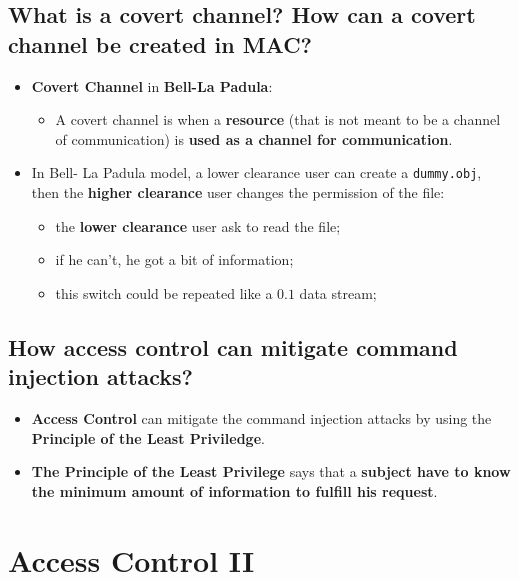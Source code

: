 \documentclass[9pt, letterpaper]{article}
\begin{document}
\subsection{What is a covert channel? How can a covert channel be created in MAC?}
\begin{itemize}
	\item \textbf{Covert Channel} in \textbf{Bell-La Padula}:
	      \begin{itemize}
		      \item  A covert channel is when a \textbf{resource} (that is not meant to be a channel of communication) is \textbf{used as a channel for communication}.
	      \end{itemize}
	\item In Bell- La Padula model, a lower clearance user can create a {\tt dummy.obj}, then the \textbf{higher clearance} user changes the permission of the file:
	      \begin{itemize}
		      \item the \textbf{lower clearance} user ask to read the file;
		      \item if he can't, he got a bit of information;
		      \item this switch could be repeated like a $0.1$ data stream;
	      \end{itemize}
\end{itemize}

\subsection{How access control can mitigate command injection attacks?}
\begin{itemize}
	\item \textbf{Access Control} can mitigate the command injection attacks by using the \textbf{Principle of the Least Priviledge}.
	\item \textbf{The Principle of the Least Privilege} says that a \textbf{subject have to know the minimum amount of information to fulfill his request}.
\end{itemize}

\newpage

\section{Access Control II}
\end{document}
